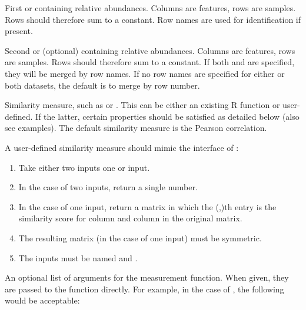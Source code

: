 \documentclass{article}\usepackage[]{graphicx}\usepackage[usenames,dvipsnames]{color}
\begin{document}
\begin{description}
\setlength{\itemsep}{1em}

\item[\Rcode{x}]
First  or  containing relative abundances.  Columns are features, rows are samples.  Rows should therefore sum to a constant.  Row names are used for identification if present.

\item[\Rcode{y}]
Second  or  (optional) containing relative abundances.  Columns are features, rows are samples.  Rows should therefore sum to a constant.  If both  and  are specified, they will be merged by row names.  If no row names are specified for either or both datasets,   the default is to merge by row number.

\item[\Rcode{sim.score}]
Similarity measure, such as  or .  This can be either an existing R function or user-defined.  If the latter, certain properties should be satisfied as detailed below (also see examples).  The default similarity measure is the Pearson correlation.

A user-defined similarity measure should mimic the interface of :
\begin{enumerate}
\item Take either two  inputs one  or  input.

\item In the case of two inputs, return a single number.

\item In the case of one input, return a matrix in which the (,)th entry is the similarity score for column  and column  in the original matrix.

\item The resulting matrix (in the case of one input) must be symmetric.

\item The inputs must be named  and .
\end{enumerate}

\item[\Rcode{sim.score.args}]
An optional list of arguments for the measurement function.  When given, they are passed to the  function directly.  For example, in the case of , the following would be acceptable:


\end{description}
\end{document}
